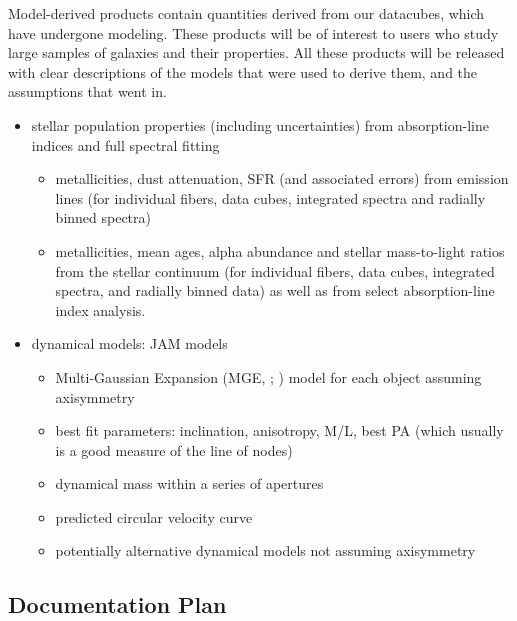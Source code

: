 \documentclass[preprint,11pt]{aastex}
\begin{document}
Model-derived products contain quantities derived from our datacubes,
which have undergone modeling. These products will be of interest to
users who study large samples of galaxies and their properties. All
these products will be released with clear descriptions of the models
that were used to derive them, and the assumptions that went in.

\begin{itemize}
\item stellar population properties (including uncertainties) from
  absorption-line indices and full spectral fitting
  \begin{itemize}
    \item  metallicities, dust attenuation, SFR (and associated errors)  from
 emission lines (for individual fibers, data cubes, integrated spectra
 and radially binned spectra)
\item metallicities, mean ages, alpha abundance and stellar
  mass-to-light ratios from the stellar continuum (for individual
  fibers, data cubes, integrated spectra, and radially binned data) as
  well as from select absorption-line index analysis.
    \end{itemize}
\item dynamical models: JAM models \citep{cappellari2008}
  \begin{itemize}
  \item Multi-Gaussian Expansion (MGE, \citealt{emsellem1994}; \citealt{cappellari2002}) model for each object assuming axisymmetry
  \item best fit parameters: inclination, anisotropy, M/L, best PA
    (which usually is a good measure of the line of nodes)
  \item dynamical mass within a series of apertures
   \item predicted circular velocity curve
\item potentially alternative dynamical models not assuming axisymmetry
   \end{itemize} 
\end{itemize}


\subsection{Documentation Plan} \label{sec:documentation}

\end{document}
